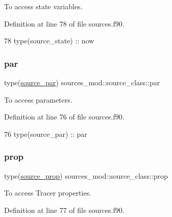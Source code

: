 To access state variables. 



Definition at line 78 of file sources.\+f90.


\begin{DoxyCode}
78         \textcolor{keywordtype}{type}(source\_state) :: now
\end{DoxyCode}
\mbox{\label{structsources__mod_1_1source__class_a7dcca40df4b520fa207dbe93d7e49b2e}} 
\subsubsection{\texorpdfstring{par}{par}}
{\footnotesize\ttfamily type(\mbox{\hyperlink{structsources__mod_1_1source__par}{source\+\_\+par}}) sources\+\_\+mod\+::source\+\_\+class\+::par\hspace{0.3cm}{\ttfamily [private]}}



To access parameters. 



Definition at line 76 of file sources.\+f90.


\begin{DoxyCode}
76         \textcolor{keywordtype}{type}(source\_par)   :: par
\end{DoxyCode}
\mbox{\label{structsources__mod_1_1source__class_a5acc9ceca409e3c1ef2ed8112325a845}} 
\subsubsection{\texorpdfstring{prop}{prop}}
{\footnotesize\ttfamily type(\mbox{\hyperlink{structsources__mod_1_1source__prop}{source\+\_\+prop}}) sources\+\_\+mod\+::source\+\_\+class\+::prop\hspace{0.3cm}{\ttfamily [private]}}



To access Tracer properties. 



Definition at line 77 of file sources.\+f90.


